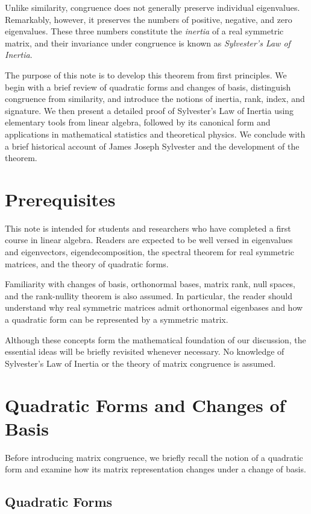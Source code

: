 \documentclass[11pt]{article}
\theoremstyle{definition}
\theoremstyle{remark}
\begin{document}
Unlike similarity, congruence does not generally preserve
individual eigenvalues. Remarkably, however, it preserves
the numbers of positive, negative, and zero eigenvalues.
These three numbers constitute the \emph{inertia} of a
real symmetric matrix, and their invariance under
congruence is known as \emph{Sylvester's Law of Inertia}.

The purpose of this note is to develop this theorem from
first principles. We begin with a brief review of quadratic forms and
changes of basis, distinguish congruence from similarity,
and introduce the notions of inertia, rank, index, and
signature. We then present a detailed proof of Sylvester's
Law of Inertia using elementary tools from linear algebra,
followed by its canonical form and applications in
mathematical statistics and theoretical physics.
We conclude with a brief historical account of James
Joseph Sylvester and the development of the theorem.

\section{Prerequisites}

This note is intended for students and researchers
who have
completed a first course in linear algebra. Readers are
expected to be well versed in eigenvalues and eigenvectors,
eigendecomposition, the spectral theorem for real symmetric
matrices, and the theory of quadratic forms.

Familiarity with changes of basis, orthonormal bases,
matrix rank, null spaces, and the rank-nullity theorem
is also assumed. In particular, the reader should
understand why real symmetric matrices admit orthonormal
eigenbases and how a quadratic form can be represented
by a symmetric matrix.

Although these concepts form the mathematical foundation
of our discussion, the essential ideas will be briefly
revisited whenever necessary. No knowledge of Sylvester's
Law of Inertia or the theory of matrix congruence is
assumed.

\section{Quadratic Forms and Changes of Basis}

Before introducing matrix congruence, we briefly recall
the notion of a quadratic form and examine how its
matrix representation changes under a change of basis.

\subsection{Quadratic Forms}
\end{document}

